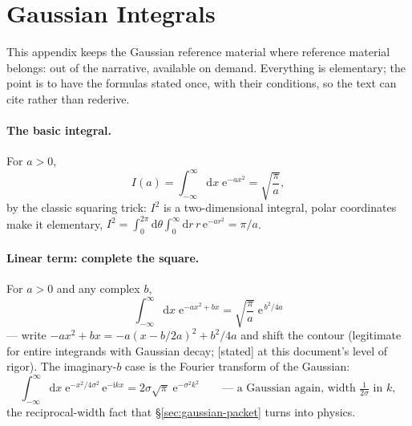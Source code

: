 \documentclass[11pt]{article}
\theoremstyle{plain}
\theoremstyle{definition}
\theoremstyle{remark}
\newcommand{\dd}{\mathrm{d}}
\newcommand{\ee}{\mathrm{e}}
\newcommand{\ii}{\mathrm{i}}
\begin{document}
\section{Gaussian Integrals}
\label{app:gaussians}

This appendix keeps the Gaussian reference material where
reference material
belongs: out of the narrative, available on demand. Everything is
elementary; the point is to have the formulas stated once, with
their conditions, so the text can cite rather than rederive.

\paragraph{The basic integral.} For $a > 0$,
\begin{equation}
  I(a) = \int_{-\infty}^{\infty}\dd x\;\ee^{-a x^2}
  = \sqrt{\frac{\pi}{a}} ,
  \label{eq:gaussian-basic}
\end{equation}
by the classic squaring trick: $I^2$ is a two-dimensional integral,
polar coordinates make it elementary,
$I^2 = \int_0^{2\pi}\!\dd\theta\int_0^\infty \dd r\, r\,
\ee^{-a r^2} = \pi/a$.

\paragraph{Linear term: complete the square.} For $a > 0$ and any
complex $b$,
\begin{equation}
  \int_{-\infty}^{\infty}\dd x\;\ee^{-a x^2 + b x}
  = \sqrt{\frac{\pi}{a}}\;\ee^{\,b^2/4a}
  \label{eq:gaussian-linear}
\end{equation}
--- write $-ax^2 + bx = -a(x - b/2a)^2 + b^2/4a$ and shift the
contour (legitimate for entire integrands with Gaussian decay;
[stated] at this document's level of rigor). The imaginary-$b$ case
is the Fourier transform of the Gaussian:
\begin{equation}
  \int_{-\infty}^{\infty}\dd x\;
  \ee^{-x^2/4\sigma^2}\,\ee^{-\ii k x}
  = 2\sigma\sqrt{\pi}\;\ee^{-\sigma^2 k^2}
  \qquad
  \text{--- a Gaussian again, width } \tfrac{1}{2\sigma}
  \text{ in } k,
  \label{eq:gaussian-fourier}
\end{equation}
the reciprocal-width fact that \S\ref{sec:gaussian-packet} turns
into physics.
\end{document}
